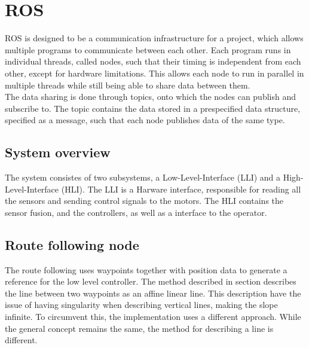 \section{ROS}
ROS is designed to be a communication infrastructure for a project, which allows multiple programs to communicate between each other. 
Each program runs in individual threads, called nodes, such that their timing is independent from each other, except for hardware limitations.  
This allows each node to run in parallel in multiple threads while still being able to share data between them.\\
The data sharing is done through topics, onto which the nodes can publish and subscribe to. 
The topic contains the data stored in a prespecified data structure, specified as a message, such that each node publishes data of the same type. 
\subsection{System overview}
The system consistes of two subsystems, a Low-Level-Interface (LLI) and a High-Level-Interface (HLI). 
The LLI is a Harware interface, responsible for reading all the sensors and sending control signals to the motors.
The HLI contains the sensor fusion, and the controllers, as well as a interface to the operator. 


\subsection{Route following node}
The route following uses waypoints together with position data to generate a reference for the low level controller. 
The method described in section describes the line between two waypoints as an affine linear line.  
This description have the issue of having singularity when describing vertical lines, making the slope infinite.  
To circumvent this, the implementation uses a different approach. 
While the general concept remains the same, the method for describing a line is different. 

